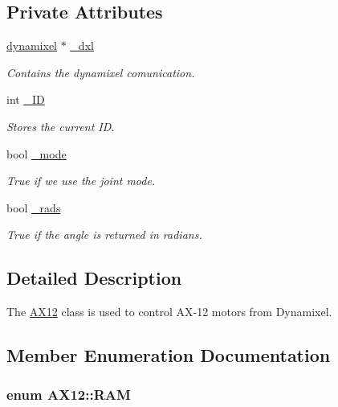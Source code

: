 \subsection*{Private Attributes}
\begin{DoxyCompactItemize}
\item 
\hyperlink{a00004}{dynamixel} $\ast$ \hyperlink{a00001_a16df7ccc0a8d3c585a93b6916734bb17}{\+\_\+dxl}
\begin{DoxyCompactList}\small\item\em Contains the dynamixel comunication. \end{DoxyCompactList}\item 
int \hyperlink{a00001_a0ae2b35fee3d120075e1d8f1e2055804}{\+\_\+\+I\+D}
\begin{DoxyCompactList}\small\item\em Stores the current I\+D. \end{DoxyCompactList}\item 
bool \hyperlink{a00001_a2fd07e2e636003227a32d09d211bd6d4}{\+\_\+mode}
\begin{DoxyCompactList}\small\item\em True if we use the joint mode. \end{DoxyCompactList}\item 
bool \hyperlink{a00001_aba71492043d7a3226f0793db57372bec}{\+\_\+rads}
\begin{DoxyCompactList}\small\item\em True if the angle is returned in radians. \end{DoxyCompactList}\end{DoxyCompactItemize}


\subsection{Detailed Description}
The \hyperlink{a00001}{A\+X12} class is used to control A\+X-\/12 motors from Dynamixel. 

\subsection{Member Enumeration Documentation}
\hypertarget{a00001_a672068c48bbee921e5856cc44b1c81c1}{}
\subsubsection[{R\+A\+M}]{\setlength{\rightskip}{0pt plus 5cm}enum {\bf A\+X12\+::\+R\+A\+M}\hspace{0.3cm}{\ttfamily [private]}}\label{a00001_a672068c48bbee921e5856cc44b1c81c1}


